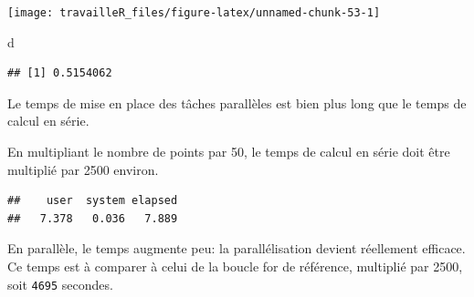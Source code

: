 \documentclass[
  12pt,
  french,
  a4paper,
  extrafontsizes,onecolumn,openright
  ]{memoir}
\newenvironment{Shaded}{\begin{snugshade}}{\end{snugshade}}
\newcommand{\DecValTok}[1]{\textcolor[rgb]{0.00,0.00,0.81}{#1}}
\newcommand{\KeywordTok}[1]{\textcolor[rgb]{0.13,0.29,0.53}{\textbf{#1}}}
\newcommand{\NormalTok}[1]{#1}
\newcommand{\OperatorTok}[1]{\textcolor[rgb]{0.81,0.36,0.00}{\textbf{#1}}}
\newcommand{\StringTok}[1]{\textcolor[rgb]{0.31,0.60,0.02}{#1}}
\begin{document}
\begin{center}\texttt{[image: travailleR\_files/figure-latex/unnamed-chunk-53-1]} \end{center}

\begin{Shaded}
\begin{Highlighting}[]
\NormalTok{d}
\end{Highlighting}
\end{Shaded}

\begin{verbatim}
## [1] 0.5154062
\end{verbatim}

\normalsize

Le temps de mise en place des tâches parallèles est bien plus long que le temps de calcul en série.

En multipliant le nombre de points par 50, le temps de calcul en série doit être multiplié par 2500 environ.

\scriptsize

\begin{Shaded}
\end{Shaded}

\begin{verbatim}
##    user  system elapsed 
##   7.378   0.036   7.889
\end{verbatim}

\normalsize

En parallèle, le temps augmente peu: la parallélisation devient réellement efficace.
Ce temps est à comparer à celui de la boucle for de référence, multiplié par 2500, soit \texttt{4695} secondes.

\scriptsize

\begin{Shaded}
\end{Shaded}
\end{document}
